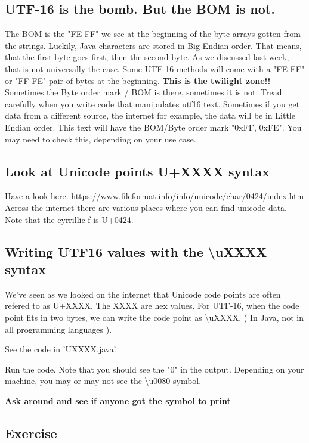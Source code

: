 \documentclass[12pt]{article}
\begin{document}
\subsection{UTF-16 is the bomb. But the BOM is not.}
The BOM is the "FE FF" we see at the beginning of the byte arrays gotten from the strings. Luckily, Java characters are stored in Big Endian order. That means, that the first byte goes first, then the second byte. As we discussed last week, that is not universally the case. Some UTF-16 methods will come with a "FE FF" or "FF FE" pair of bytes at the beginning. \textbf{This is the twilight zone!!} Sometimes the Byte order mark / BOM is there, sometimes it is not. Tread carefully when you write code that manipulates utf16 text. Sometimes if you get data from a different source, the internet for example, the data will be in Little Endian order. This text will have the BOM/Byte order mark "0xFF, 0xFE". You may need to check this, depending on your use case. 

\subsection{Look at Unicode points U+XXXX syntax}
Have a look here. \url{https://www.fileformat.info/info/unicode/char/0424/index.htm}
Across the internet there are various places where you can find unicode data.
Note that the cyrrillic f is U+0424.

\subsection{Writing UTF16 values with the \textbackslash uXXXX syntax}
We've seen as we looked on the internet that Unicode code points are often refered to as U+XXXX. The XXXX are hex values. For UTF-16, when the code point fits in two bytes, we can write the code point as \textbackslash uXXXX. ( In Java, not in all  programming languages ).

See the code in 'UXXXX.java'.

Run the code. Note that you should see the "0" in the output. Depending on your machine, you may or may not see the \textbackslash u0080 symbol.

\begin{center}
\textbf{Ask around and see if anyone got the symbol to print}
\end{center}

\subsection{Exercise}
\end{document}
